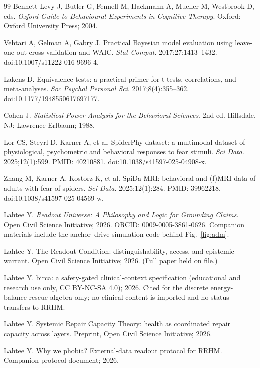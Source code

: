 \documentclass[9pt,twocolumn]{article}
\begin{document}
\begin{thebibliography}{99}
Bennett-Levy J, Butler G, Fennell M, Hackmann A, Mueller M, Westbrook D, eds. \emph{Oxford Guide to Behavioural Experiments in Cognitive Therapy}. Oxford: Oxford University Press; 2004.

Vehtari A, Gelman A, Gabry J. Practical Bayesian model evaluation using leave-one-out cross-validation and WAIC. \emph{Stat Comput}. 2017;27:1413--1432. doi:10.1007/s11222-016-9696-4.

Lakens D. Equivalence tests: a practical primer for t tests, correlations, and meta-analyses. \emph{Soc Psychol Personal Sci}. 2017;8(4):355--362. doi:10.1177/1948550617697177.

Cohen J. \emph{Statistical Power Analysis for the Behavioral Sciences}. 2nd ed. Hillsdale, NJ: Lawrence Erlbaum; 1988.

Lor CS, Steyrl D, Karner A, et al. SpiderPhy dataset: a multimodal dataset of physiological, psychometric and behavioral responses to fear stimuli. \emph{Sci Data}. 2025;12(1):599. PMID: 40210881. doi:10.1038/s41597-025-04908-x.

Zhang M, Karner A, Kostorz K, et al. SpiDa-MRI: behavioral and (f)MRI data of adults with fear of spiders. \emph{Sci Data}. 2025;12(1):284. PMID: 39962218. doi:10.1038/s41597-025-04569-w.

Lahtee Y. \emph{Readout Universe: A Philosophy and Logic for Grounding Claims}. Open Civil Science Initiative; 2026. ORCID: 0009-0005-3861-0626. Companion materials include the anchor--drive simulation code behind Fig.~\ref{fig:adm}.

Lahtee Y. The Readout Condition: distinguishability, access, and epistemic warrant. Open Civil Science Initiative; 2026. (Full paper held on file.)

Lahtee Y. birca: a safety-gated clinical-context specification (educational and research use only, CC BY-NC-SA 4.0); 2026. Cited for the discrete energy-balance rescue algebra only; no clinical content is imported and no status transfers to RRHM.

Lahtee Y. Systemic Repair Capacity Theory: health as coordinated repair capacity across layers. Preprint, Open Civil Science Initiative; 2026.

Lahtee Y. Why we phobia? External-data readout protocol for RRHM. Companion protocol document; 2026.

\end{thebibliography}

\balance
\end{document}
